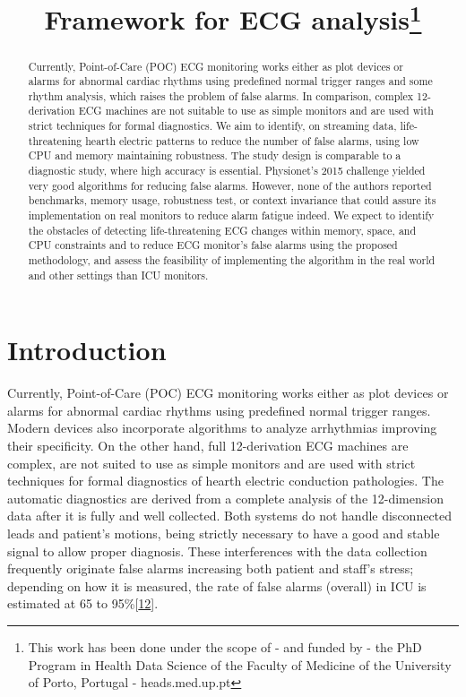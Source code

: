 \documentclass[
]{article}
\title{Framework for ECG analysis\thanks{This work has been done under
the scope of - and funded by - the PhD Program in Health Data Science of
the Faculty of Medicine of the University of Porto, Portugal -
heads.med.up.pt}}
\author{}
\date{\vspace{-2.5em}}
\begin{document}
\maketitle
\begin{abstract}
Currently, Point-of-Care (POC) ECG monitoring works either as plot
devices or alarms for abnormal cardiac rhythms using predefined normal
trigger ranges and some rhythm analysis, which raises the problem of
false alarms. In comparison, complex 12-derivation ECG machines are not
suitable to use as simple monitors and are used with strict techniques
for formal diagnostics. We aim to identify, on streaming data,
life-threatening hearth electric patterns to reduce the number of false
alarms, using low CPU and memory maintaining robustness. The study
design is comparable to a diagnostic study, where high accuracy is
essential. Physionet's 2015 challenge yielded very good algorithms for
reducing false alarms. However, none of the authors reported benchmarks,
memory usage, robustness test, or context invariance that could assure
its implementation on real monitors to reduce alarm fatigue indeed. We
expect to identify the obstacles of detecting life-threatening ECG
changes within memory, space, and CPU constraints and to reduce ECG
monitor's false alarms using the proposed methodology, and assess the
feasibility of implementing the algorithm in the real world and other
settings than ICU monitors.
\end{abstract}

\hypertarget{introduction}{%
\section{Introduction}\label{introduction}}

Currently, Point-of-Care (POC) ECG monitoring works either as plot
devices or alarms for abnormal cardiac rhythms using predefined normal
trigger ranges. Modern devices also incorporate algorithms to analyze
arrhythmias improving their specificity. On the other hand, full
12-derivation ECG machines are complex, are not suited to use as simple
monitors and are used with strict techniques for formal diagnostics of
hearth electric conduction pathologies. The automatic diagnostics are
derived from a complete analysis of the 12-dimension data after it is
fully and well collected. Both systems do not handle disconnected leads
and patient's motions, being strictly necessary to have a good and
stable signal to allow proper diagnosis. These interferences with the
data collection frequently originate false alarms increasing both
patient and staff's stress; depending on how it is measured, the rate of
false alarms (overall) in ICU is estimated at 65 to
95\%{[}\protect\hyperlink{ref-donchin2002}{12}{]}.
\end{document}
